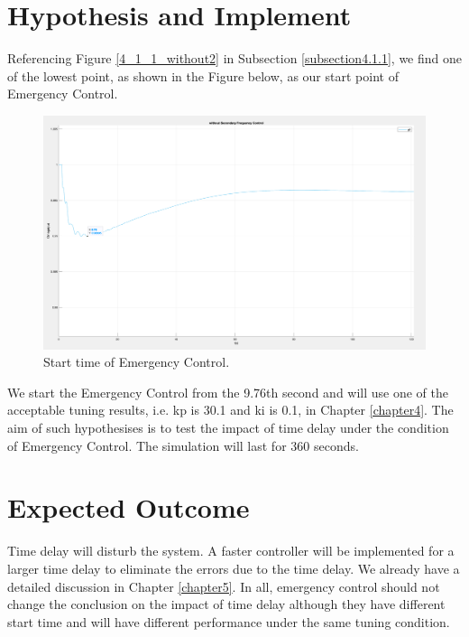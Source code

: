 \documentclass{report}
\begin{document}
\section{Hypothesis and Implement} %
Referencing Figure \textcolor{red}{\ref{4_1_1_without2}} in Subsection \textcolor{red}{\ref{subsection4.1.1}}, we find one of the lowest point, as shown in the Figure below, as our start point of Emergency Control. \\

\begin{figure}[htbp]
\centering
\includegraphics[width = .819\textwidth]{figure/6_2_g9.png}
\caption{Start time of Emergency Control.}
\label{6_2_g9}
\end{figure}

We start the Emergency Control from the 9.76th second and will use one of the acceptable tuning results, i.e. kp is 30.1 and ki is 0.1, in Chapter \textcolor{red}{\ref{chapter4}}. The aim of such hypothesises is to test the impact of time delay under the condition of Emergency Control. The simulation will last for 360 seconds.\\



\section{Expected Outcome} %
Time delay will disturb the system. A faster controller will be implemented for a larger time delay to eliminate the errors due to the time delay. We already have a detailed discussion in Chapter \textcolor{red}{\ref{chapter5}}. In all, emergency control should not change the conclusion on the impact of time delay although they have different start time and will have different performance under the same tuning condition.\\
\end{document}
